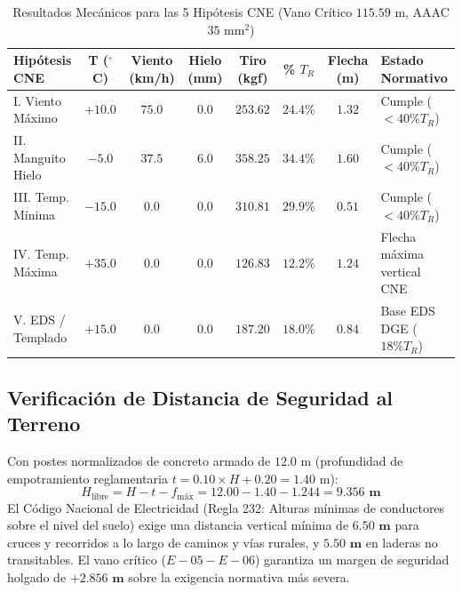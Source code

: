 \documentclass[12pt,a4paper]{report}
\begin{document}
\begin{table}[H]
\centering
\caption{Resultados Mecánicos para las 5 Hipótesis CNE (Vano Crítico $115.59\text{ m}$, AAAC $35\text{ mm}^2$)}
\label{tab:hipotesis_mecanicas}
\footnotesize
\begin{tabularx}{\linewidth}{L c c c c c c L}
\toprule
\textbf{Hipótesis CNE} & \textbf{T ($^\circ$C)} & \textbf{Viento (km/h)} & \textbf{Hielo (mm)} & \textbf{Tiro (kgf)} & \textbf{\% $T_R$} & \textbf{Flecha (m)} & \textbf{Estado Normativo} \\
\midrule
I. Viento Máximo & $+10.0$ & $75.0$ & $0.0$ & $253.62$ & $24.4\%$ & $1.32$ & Cumple ($< 40\% T_R$) \\
II. Manguito Hielo & $-5.0$ & $37.5$ & $6.0$ & $358.25$ & $34.4\%$ & $1.60$ & Cumple ($< 40\% T_R$) \\
III. Temp. Mínima & $-15.0$ & $0.0$ & $0.0$ & $310.81$ & $29.9\%$ & $0.51$ & Cumple ($< 40\% T_R$) \\
IV. Temp. Máxima & $+35.0$ & $0.0$ & $0.0$ & $126.83$ & $12.2\%$ & $\mathbf{1.24}$ & Flecha máxima vertical CNE \\
V. EDS / Templado & $+15.0$ & $0.0$ & $0.0$ & $\mathbf{187.20}$ & $\mathbf{18.0\%}$ & $0.84$ & Base EDS DGE ($18\% T_R$) \\
\bottomrule
\end{tabularx}
\end{table}

\clearpage
\subsection{Verificación de Distancia de Seguridad al Terreno}
Con postes normalizados de concreto armado de $12.0\text{ m}$ (profundidad de empotramiento reglamentaria $t = 0.10 \times H + 0.20 = 1.40\text{ m}$):
\begin{equation}
    H_{\text{libre}} = H - t - f_{\text{máx}} = 12.00 - 1.40 - 1.244 = \mathbf{9.356\text{ m}}
\end{equation}
El Código Nacional de Electricidad (Regla 232: Alturas mínimas de conductores sobre el nivel del suelo) exige una distancia vertical mínima de $\mathbf{6.50\text{ m}}$ para cruces y recorridos a lo largo de caminos y vías rurales, y $\mathbf{5.50\text{ m}}$ en laderas no transitables. El vano crítico ($E-05 - E-06$) garantiza un margen de seguridad holgado de $\mathbf{+2.856\text{ m}}$ sobre la exigencia normativa más severa.
\end{document}
